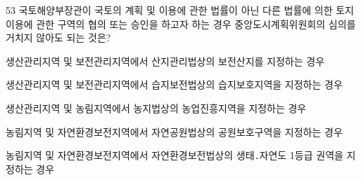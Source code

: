 \begin{question}{53}
국토해양부장관이 국토의 계획 및 이용에 관한 법률이 아닌 다른 법률에 의한 토지이용에 관한 구역의 협의 또는 승인을 하고자 하는 경우 중앙도시계획위원회의 심의를 거치지 않아도 되는 것은?
\begin{choices}
  \item 생산관리지역 및 보전관리지역에서 산지관리법상의 보전산지를 지정하는 경우
  \item 생산관리지역 및 보전관리지역에서 습지보전법상의 습지보호지역을 지정하는 경우
  \item 생산관리지역 및 농림지역에서 농지법상의 농업진흥지역을 지정하는 경우
  \item 농림지역 및 자연환경보전지역에서 자연공원법상의 공원보호구역을 지정하는 경우
  \item 농림지역 및 자연환경보전지역에서 자연환경보전법상의 생태․자연도 1등급 권역을 지정하는 경우
\end{choices}
\end{question}
\answerall
{}
